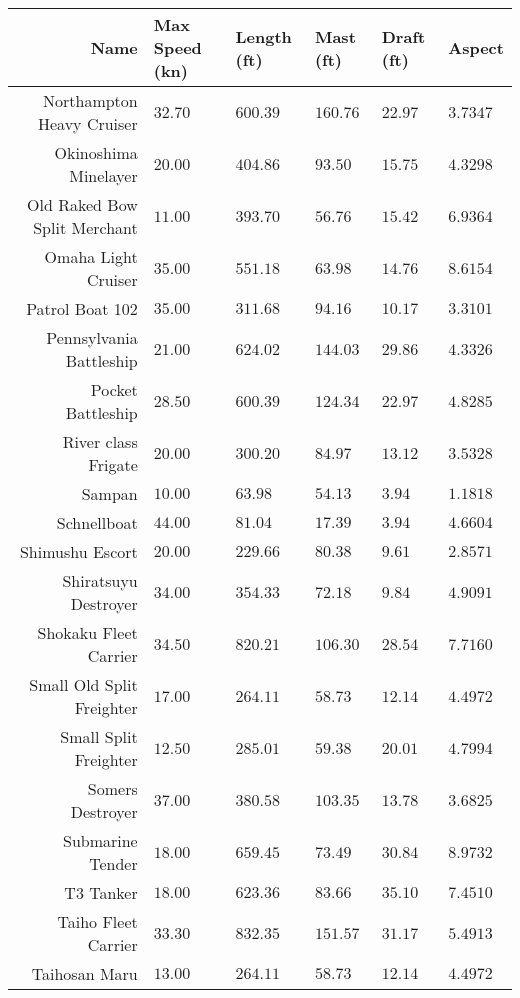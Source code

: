 \documentclass{article}
\begin{document}
\pagebreak
\begin{tabularx}{\textwidth}{|r|l|l|X|X|X|}
\hline
Name & Max Speed (kn) & Length (ft) & Mast (ft) & Draft (ft) & Aspect\\
\hline
Northampton Heavy Cruiser & $32.70$ & $600.39$ & $160.76$ & $22.97$ & $3.7347$ \\
\hline
Okinoshima Minelayer & $20.00$ & $404.86$ & $93.50$ & $15.75$ & $4.3298$ \\
\hline
Old Raked Bow Split Merchant & $11.00$ & $393.70$ & $56.76$ & $15.42$ & $6.9364$ \\
\hline
Omaha Light Cruiser & $35.00$ & $551.18$ & $63.98$ & $14.76$ & $8.6154$ \\
\hline
Patrol Boat 102 & $35.00$ & $311.68$ & $94.16$ & $10.17$ & $3.3101$ \\
\hline
Pennsylvania Battleship & $21.00$ & $624.02$ & $144.03$ & $29.86$ & $4.3326$ \\
\hline
Pocket Battleship & $28.50$ & $600.39$ & $124.34$ & $22.97$ & $4.8285$ \\
\hline
River class Frigate & $20.00$ & $300.20$ & $84.97$ & $13.12$ & $3.5328$ \\
\hline
Sampan & $10.00$ & $63.98$ & $54.13$ & $3.94$ & $1.1818$ \\
\hline
Schnellboat & $44.00$ & $81.04$ & $17.39$ & $3.94$ & $4.6604$ \\
\hline
Shimushu Escort & $20.00$ & $229.66$ & $80.38$ & $9.61$ & $2.8571$ \\
\hline
Shiratsuyu Destroyer & $34.00$ & $354.33$ & $72.18$ & $9.84$ & $4.9091$ \\
\hline
Shokaku Fleet Carrier & $34.50$ & $820.21$ & $106.30$ & $28.54$ & $7.7160$ \\
\hline
Small Old Split Freighter & $17.00$ & $264.11$ & $58.73$ & $12.14$ & $4.4972$ \\
\hline
Small Split Freighter & $12.50$ & $285.01$ & $59.38$ & $20.01$ & $4.7994$ \\
\hline
Somers Destroyer & $37.00$ & $380.58$ & $103.35$ & $13.78$ & $3.6825$ \\
\hline
Submarine Tender & $18.00$ & $659.45$ & $73.49$ & $30.84$ & $8.9732$ \\
\hline
T3 Tanker & $18.00$ & $623.36$ & $83.66$ & $35.10$ & $7.4510$ \\
\hline
Taiho Fleet Carrier & $33.30$ & $832.35$ & $151.57$ & $31.17$ & $5.4913$ \\
\hline
Taihosan Maru & $13.00$ & $264.11$ & $58.73$ & $12.14$ & $4.4972$ \\
\hline
\end{tabularx}
\pagebreak
\end{document}
